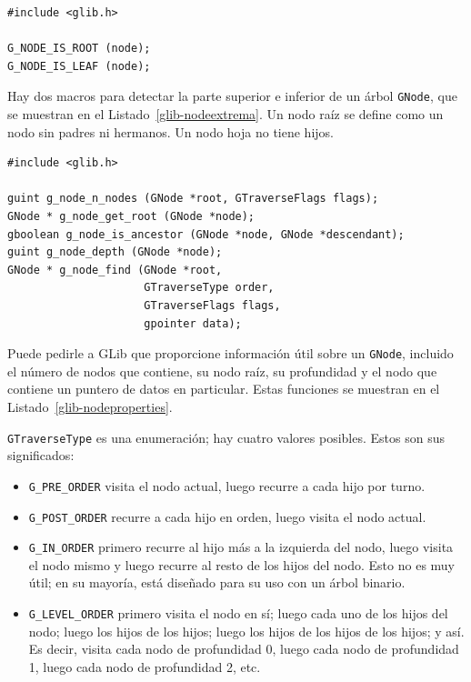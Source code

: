 \begin{lstlisting}[style=GLib/GTK, caption={Predicados para \lstinline{GNode}}, label=glib-nodeextrema]
#include <glib.h>

G_NODE_IS_ROOT (node);
G_NODE_IS_LEAF (node);
\end{lstlisting}

Hay dos macros para detectar la parte superior e inferior de un árbol \lstinline{GNode}, que se muestran en el Listado~\ref{glib-nodeextrema}. Un nodo raíz se define como un nodo sin padres ni hermanos. Un nodo hoja no tiene hijos.

\begin{lstlisting}[style=GLib/GTK, caption={Propiedades de \lstinline{GNode}}, label=glib-nodeproperties]
#include <glib.h>

guint g_node_n_nodes (GNode *root, GTraverseFlags flags);
GNode * g_node_get_root (GNode *node);
gboolean g_node_is_ancestor (GNode *node, GNode *descendant);
guint g_node_depth (GNode *node);
GNode * g_node_find (GNode *root,
                     GTraverseType order,
                     GTraverseFlags flags,
                     gpointer data);
\end{lstlisting}

Puede pedirle a GLib que proporcione información útil sobre un \lstinline{GNode}, incluido el número de nodos que contiene, su nodo raíz, su profundidad y el nodo que contiene un puntero de datos en particular. Estas funciones se muestran en el Listado~\ref{glib-nodeproperties}.

\lstinline{GTraverseType} es una enumeración; hay cuatro valores posibles. Estos son sus significados:
\begin{itemize}
    \item \lstinline{G_PRE_ORDER} visita el nodo actual, luego recurre a cada hijo por turno.
    
    \item \lstinline{G_POST_ORDER} recurre a cada hijo en orden, luego visita el nodo actual.
    
    \item \lstinline{G_IN_ORDER} primero recurre al hijo más a la izquierda del nodo, luego visita el nodo mismo y luego recurre al resto de los hijos del nodo. Esto no es muy útil; en su mayoría, está diseñado para su uso con un árbol binario.
    
    \item \lstinline{G_LEVEL_ORDER} primero visita el nodo en sí; luego cada uno de los hijos del nodo; luego los hijos de los hijos; luego los hijos de los hijos de los hijos; y así. Es decir, visita cada nodo de profundidad 0, luego cada nodo de profundidad 1, luego cada nodo de profundidad 2, etc.
\end{itemize}

